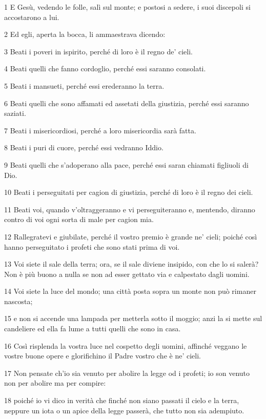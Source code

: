 \par 1 E Gesù, vedendo le folle, salì sul monte; e postosi a sedere, i suoi discepoli si accostarono a lui.
\par 2 Ed egli, aperta la bocca, li ammaestrava dicendo:
\par 3 Beati i poveri in ispirito, perché di loro è il regno de' cieli.
\par 4 Beati quelli che fanno cordoglio, perché essi saranno consolati.
\par 5 Beati i mansueti, perché essi erederanno la terra.
\par 6 Beati quelli che sono affamati ed assetati della giustizia, perché essi saranno saziati.
\par 7 Beati i misericordiosi, perché a loro misericordia sarà fatta.
\par 8 Beati i puri di cuore, perché essi vedranno Iddio.
\par 9 Beati quelli che s'adoperano alla pace, perché essi saran chiamati figliuoli di Dio.
\par 10 Beati i perseguitati per cagion di giustizia, perché di loro è il regno dei cieli.
\par 11 Beati voi, quando v'oltraggeranno e vi perseguiteranno e, mentendo, diranno contro di voi ogni sorta di male per cagion mia.
\par 12 Rallegratevi e giubilate, perché il vostro premio è grande ne' cieli; poiché così hanno perseguitato i profeti che sono stati prima di voi.
\par 13 Voi siete il sale della terra; ora, se il sale diviene insipido, con che lo si salerà? Non è più buono a nulla se non ad esser gettato via e calpestato dagli uomini.
\par 14 Voi siete la luce del mondo; una città posta sopra un monte non può rimaner nascosta;
\par 15 e non si accende una lampada per metterla sotto il moggio; anzi la si mette sul candeliere ed ella fa lume a tutti quelli che sono in casa.
\par 16 Così risplenda la vostra luce nel cospetto degli uomini, affinché veggano le vostre buone opere e glorifichino il Padre vostro che è ne' cieli.
\par 17 Non pensate ch'io sia venuto per abolire la legge od i profeti; io son venuto non per abolire ma per compire:
\par 18 poiché io vi dico in verità che finché non siano passati il cielo e la terra, neppure un iota o un apice della legge passerà, che tutto non sia adempiuto.

